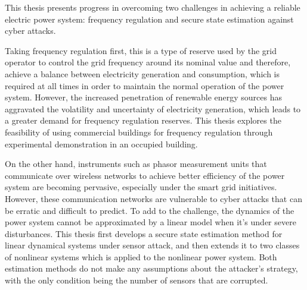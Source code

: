 \documentclass[12pt, oneside, final]{lib/ucthesis}
\begin{document}
\begin{frontmatter} 
\maketitle
\copyrightpage
\abstract
This thesis presents progress in overcoming two challenges in achieving a reliable electric power system: frequency regulation and secure state estimation against cyber attacks.

Taking frequency regulation first, this is a type of reserve used by the grid operator to control the grid frequency around its nominal value and therefore, achieve a balance between electricity generation and consumption, which is required at all times in order to maintain the normal operation of the power system.
However, the increased penetration of renewable energy sources has aggravated the volatility and uncertainty of electricity generation, which leads to a greater demand for frequency regulation reserves.
This thesis explores the feasibility of using commercial buildings for frequency regulation through experimental demonstration in an occupied building.

On the other hand, instruments such as phasor measurement units that communicate over wireless networks to achieve better efficiency of the power system are becoming pervasive, especially under the smart grid initiatives. 
However, these communication networks are vulnerable to cyber attacks that can be erratic and difficult to predict.
To add to the challenge, the dynamics of the power system cannot be approximated by a linear model when it's under severe disturbances.
This thesis first develops a secure state estimation method for linear dynamical systems under sensor attack, and then extends it to two classes of nonlinear systems which is applied to the nonlinear power system.
Both estimation methods do not make any assumptions about the attacker's strategy, with the only condition being the number of sensors that are corrupted.

\endabstract

\end{frontmatter}
\begin{optionalFrontMatter}
%
\end{optionalFrontMatter}
\end{document}
